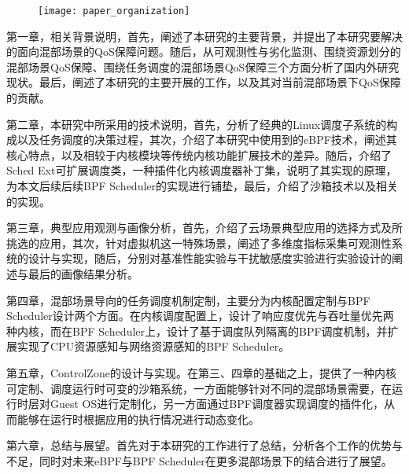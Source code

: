 \begin{figure}[!htbp]
    \centering
    \texttt{[image: paper\_organization]}
    \label{fig:paper_organization}
\end{figure}

第一章，相关背景说明，首先，阐述了本研究的主要背景，并提出了本研究要解决的面向混部场景的QoS保障问题。随后，从可观测性与劣化监测、围绕资源划分的混部场景QoS保障、围绕任务调度的混部场景QoS保障三个方面分析了国内外研究现状。最后，阐述了本研究的主要开展的工作，以及其对当前混部场景下QoS保障的贡献。

第二章，本研究中所采用的技术说明，首先，分析了经典的Linux调度子系统的构成以及任务调度的决策过程，其次，介绍了本研究中使用到的eBPF技术，阐述其核心特点，以及相较于内核模块等传统内核功能扩展技术的差异。随后，介绍了Sched Ext可扩展调度类，一种插件化内核调度器补丁集，说明了其实现的原理，为本文后续后续BPF Scheduler的实现进行铺垫，最后，介绍了沙箱技术以及相关的实现。

第三章，典型应用观测与画像分析，首先，介绍了云场景典型应用的选择方式及所挑选的应用，其次，针对虚拟机这一特殊场景，阐述了多维度指标采集可观测性系统的设计与实现，随后，分别对基准性能实验与干扰敏感度实验进行实验设计的阐述与最后的画像结果分析。

第四章，混部场景导向的任务调度机制定制，主要分为内核配置定制与BPF Scheduler设计两个方面。在内核调度配置上，设计了响应度优先与吞吐量优先两种内核，而在BPF Scheduler上，设计了基于调度队列隔离的BPF调度机制，并扩展实现了CPU资源感知与网络资源感知的BPF Scheduler。

第五章，ControlZone的设计与实现。在第三、四章的基础之上，提供了一种内核可定制、调度运行时可变的沙箱系统，一方面能够针对不同的混部场景需要，在运行时层对Guest OS进行定制化，另一方面通过BPF调度器实现调度的插件化，从而能够在运行时根据应用的执行情况进行动态变化。

第六章，总结与展望。首先对于本研究的工作进行了总结，分析各个工作的优势与不足，同时对未来eBPF与BPF Scheduler在更多混部场景下的结合进行了展望。